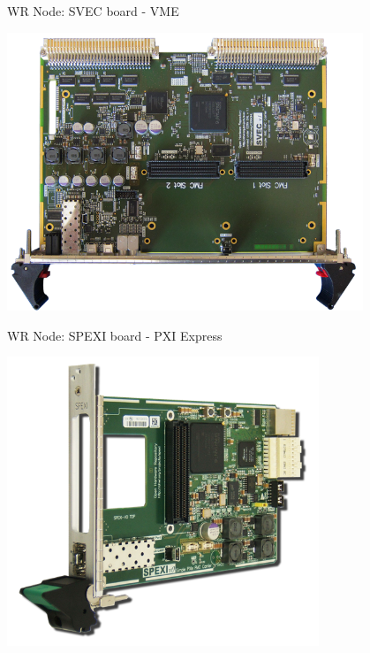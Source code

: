 \documentclass[compress,red]{beamer}
\begin{document}
\begin{frame}{WR Node: SVEC board - VME}
    \begin{center}
      \includegraphics[width=0.8\textwidth]{../../figures/node/svectop_s.png}
    \end{center}
\end{frame}


\begin{frame}{WR Node: SPEXI board - PXI Express}
    \begin{center}
      \includegraphics[width=0.7\textwidth]{../../figures/node/spexi_v0.png} 
    \end{center}
\end{frame}
\end{document}
